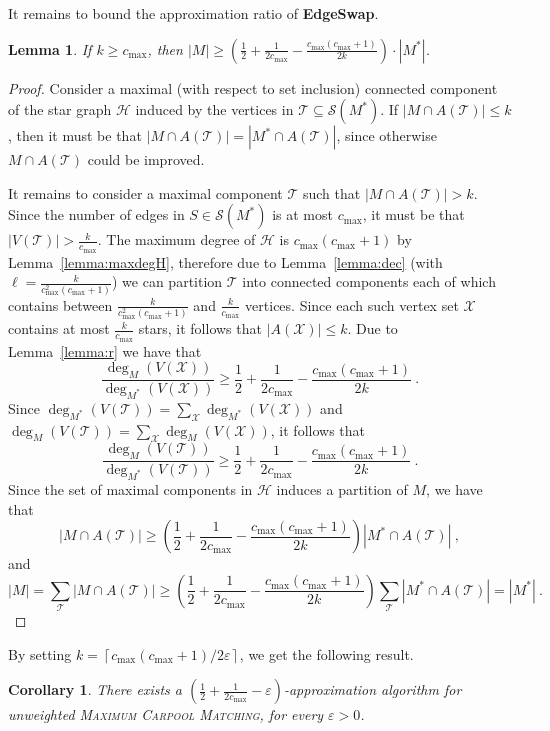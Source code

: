 \documentclass[11pt]{article}
\newtheorem{lemma}{Lemma}
\newtheorem{corollary}[theorem]{Corollary}
\newcommand{\abs}[1]{\left| #1 \right|}
\newcommand{\ceil}[1]{\left\lceil #1 \right\rceil}
\newcommand{\paren}[1]{\left( #1 \right)}
\newcommand{\half}{\frac{1}{2}}
\newcommand{\inv}[1]{\frac{1}{#1}}
\newcommand{\carpool}{\textsc{Maximum Carpool Matching}\xspace}
\newcommand{\cmax}{c_{\max}}
\newcommand{\eps}{\varepsilon}
\newcommand{\calS}{\mathcal{S}}
\newcommand{\calT}{\mathcal{T}}
\newcommand{\calX}{\mathcal{X}}
\newcommand{\calH}{\mathcal{H}}
\begin{document}
\fi %

It remains to bound the approximation ratio of \textbf{EdgeSwap}.

\begin{lemma}
If $k \geq \cmax$, then $\abs{M} \geq (\half + \inv{2\cmax}
- \frac{\cmax(\cmax+1)}{2k}) \cdot \abs{M^*}$.
\end{lemma}
\begin{proof}
Consider a maximal (with respect to set inclusion) connected component
of the star graph $\calH$ induced by the vertices in $\calT \subseteq
\calS(M^*)$.
%
If $\abs{M \cap A(\calT)} \leq k$, then it must be that $\abs{M \cap
A(\calT)} = \abs{M^* \cap A(\calT)}$, since otherwise $M \cap
A(\calT)$ could be improved.

It remains to consider a maximal component $\calT$ such that $\abs{M
  \cap A(\calT)} > k$.  Since the number of edges in $S \in
\calS(M^*)$ is at most $\cmax$, it must be that $\abs{V(\calT)} >
\frac{k}{\cmax}$.
%
The maximum degree of $\calH$ is $\cmax(\cmax+1)$ by
Lemma~\ref{lemma:maxdegH}, therefore due to Lemma~\ref{lemma:dec}
(with $\ell = \frac{k}{\cmax^2(\cmax+1)}$) we can partition $\calT$
into connected components each of which contains between
$\frac{k}{\cmax^2(\cmax+1)}$ and $\frac{k}{\cmax}$ vertices.
%
Since each such vertex set $\calX$
contains at most $\frac{k}{\cmax}$ stars, it follows that
$\abs{A(\calX)} \leq k$.
%
Due to Lemma~\ref{lemma:r} we have that
\[
\frac{\deg_M(V(\calX))}{\deg_{M^*}(V(\calX))} 
\geq \half + \inv{2\cmax} - \frac{\cmax(\cmax+1)}{2k}
~.
\]
Since $\deg_{M^*}(V(\calT)) = \sum_{\calX} \deg_{M^*}(V(\calX))$ and
$\deg_M(V(\calT)) = \sum_{\calX} \deg_M(V(\calX))$, it follows that
\[
\frac{\deg_M(V(\calT))}{\deg_{M^*}(V(\calT))}
\geq \half + \inv{2\cmax} - \frac{\cmax(\cmax+1)}{2k}
~.
\]
Since the set of maximal components in $\calH$ induces a partition of
$M$, we have that
\[
\abs{M \cap A(\calT)}
\geq \paren{ \half + \inv{2\cmax} -
             \frac{\cmax(\cmax+1)}{2k}} \abs{M^* \cap A(\calT)}
~,
\]
and 
\[
\abs{M}
=    \sum_{\calT} \abs{M \cap A(\calT)}
\geq \paren{ \half + \inv{2\cmax} - \frac{\cmax(\cmax+1)}{2k}}
       \sum_{\calT} \abs{M^* \cap A(\calT)}
=    \abs{M^*}
~.
\]
\end{proof}

By setting $k = \ceil{\cmax(\cmax+1)/2\eps}$, we get the following
result.

\begin{corollary}
\label{cor:local}
There exists a $(\half + \inv{2\cmax} - \eps)$-approximation algorithm
for unweighted \carpool, for every $\eps>0$.
\end{corollary}
\end{document}

